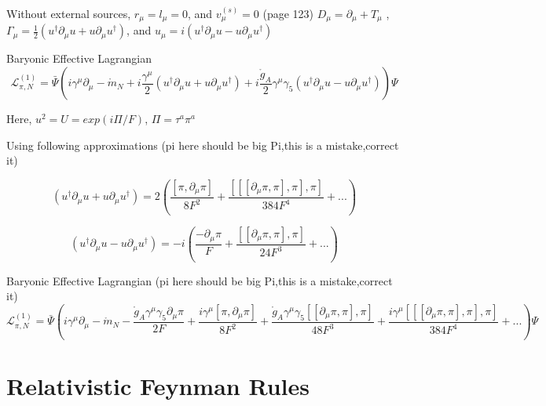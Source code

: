 \documentclass{article}
\begin{document}
\vspace{5mm}


Without external sources, $ r_{\mu} = l_{\mu} =0 $, and $v_{\mu}^{(s)}=0 $ \cite{scherer2003introduction} (page 123)
$ D_{\mu} = \partial_{\mu} + T_{\mu}$ ,  
$\Gamma_{\mu} = \frac{1}{2} \left(  u^{\dag} \partial_{\mu} u + u \partial_{\mu} u^{\dag} \right)   $, and
$ u_{\mu} = i \left(  u^{\dag} \partial_{\mu} u - u \partial_{\mu} u^{\dag} \right)   $


\vspace{5mm}
Baryonic Effective Lagrangian
$$ \mathcal{L}_{\pi,N}^{(1)} = \bar{\Psi} \left( i\gamma^{\mu}  \partial_{\mu}    -\mathring{m}_{N}
 + i\frac{\gamma^{\mu}}{2} \left(  u^{\dag} \partial_{\mu} u + u \partial_{\mu} u^{\dag}  \right)  
+ i \frac{\mathring{g}_{A}}{2} \gamma^{\mu} \gamma_{5} \left(  u^{\dag} \partial_{\mu} u - u \partial_{\mu} u^{\dag} \right) \right) \Psi$$ 

\vspace{5mm}
Here, $u^{2}= U = exp(i \Pi/F) $, $ \Pi = \tau^{a} \pi^{a} $


 
Using following approximations (pi here should be big Pi,this is a mistake,correct it)

$$ \left(  u^{\dag} \partial_{\mu} u + u \partial_{\mu} u^{\dag} \right) = 
2\left( \frac{ \left[\pi,\partial_{\mu}\pi \right] }{8F^2} 
+ \frac{ \left[\left[\left[\partial_{\mu}\pi,\pi \right],\pi \right],\pi \right] }{384F^4} +... \right) $$

$$ \left(  u^{\dag} \partial_{\mu} u - u \partial_{\mu} u^{\dag} \right) = -i
\left( \frac{ -\partial_{\mu}\pi }{F} 
+ \frac{ \left[\left[\partial_{\mu}\pi,\pi \right],\pi \right] }{24F^3} +... \right) $$



Baryonic Effective Lagrangian (pi here should be big Pi,this is a mistake,correct it)
$$ \mathcal{L}_{\pi,N}^{(1)} = \bar{\Psi} \left( i\gamma^{\mu}  \partial_{\mu}    -\mathring{m}_{N}
- \frac{\mathring{g}_{A} \gamma^{\mu} \gamma_{5} \partial_{\mu}\pi}{2F} 
+ \frac{i\gamma^{\mu} \left[\pi,\partial_{\mu}\pi \right] }{8F^2}  
+ \frac{\mathring{g}_{A} \gamma^{\mu} \gamma_{5} \left[\left[\partial_{\mu}\pi,\pi \right],\pi \right]}{48F^3}
+ \frac{i\gamma^{\mu} \left[\left[\left[\partial_{\mu}\pi,\pi \right],\pi \right],\pi \right] }{384F^4}  
+... \right) \Psi$$ 





\newpage
\section{Relativistic Feynman Rules}
\end{document}
